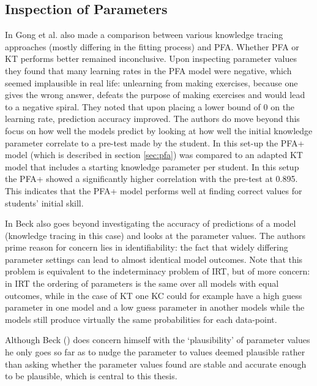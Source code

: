 \documentclass{scrartcl}
\begin{document}
\subsection{Inspection of Parameters}
In \cite{ktpfa} Gong et al. also made a comparison between various knowledge tracing approaches (mostly differing in the fitting process) and PFA. Whether PFA or KT performs better remained inconclusive. Upon inspecting parameter values they found that many learning rates in the PFA model were negative, which seemed implausible in real life: unlearning from making exercises, because one gives the wrong answer, defeats the purpose of making exercises and would lead to a negative spiral. They noted that upon placing a lower bound of 0 on the learning rate, prediction accuracy improved. The authors do move beyond this focus on how well the models predict by looking at how well the initial knowledge parameter correlate to a pre-test made by the student. In this set-up the PFA+ model (which is described in section \ref{sec:pfa}) was compared to an adapted KT model that includes a starting knowledge parameter per student. In this setup the PFA+ showed a significantly higher correlation with the pre-test at 0.895. This indicates that the PFA+ model performs well at finding correct values for students' initial skill.

In \cite{knowledgeproblem} Beck also goes beyond investigating the accuracy of predictions of a model (knowledge tracing in this case) and looks at the parameter values. The authors prime reason for concern lies in identifiability: the fact that widely differing parameter settings can lead to almost identical model outcomes. Note that this problem is equivalent to the indeterminacy problem of IRT, but of more concern: in IRT the ordering of parameters is the same over all models with equal outcomes, while in the case of KT one KC could for example have a high guess parameter in one model and a low guess parameter in another models while the models still produce virtually the same probabilities for each data-point. 

Although Beck (\cite{knowledgeproblem}) does concern himself with the `plausibility' of parameter values he only goes so far as to nudge the parameter to values deemed plausible rather than asking whether the parameter values found are stable and accurate enough to be plausible, which is central to this thesis.
\end{document}
